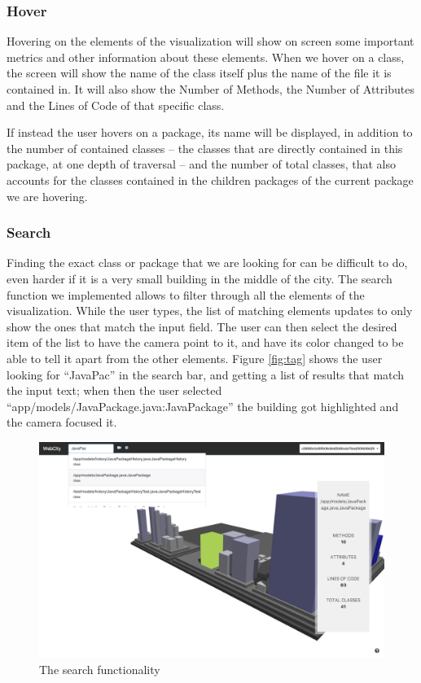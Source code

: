 \documentclass[]{usiinfbachelorproject}
\begin{document}
\subsubsection{Hover} \label{Hover}
Hovering on the elements of the visualization will show on screen some important metrics and other information about these elements.
When we hover on a class, the screen will show the name of the class itself plus the name of the file it is contained in. It will also show the Number of Methods,
 the Number of Attributes and the Lines of Code of that specific class.

 If instead the user hovers on a package, its name will be displayed, in addition to the number of contained classes -- the classes that are directly contained in this package, at one depth of traversal --
  and the number of total classes, that also accounts for the classes contained in the children packages of the current package we are hovering.

\subsubsection{Search} \label{Search}
Finding the exact class or package that we are looking for can be difficult to do, even harder if it is a very small building in the middle of the city.
The search function we implemented allows to filter through all the elements of the visualization. While the user types,
the list of matching elements updates to only show the ones that match the input field. The user can then select the desired item of the list to have the camera point to it,
and have its color changed to be able to tell it apart from the other elements.
Figure \ref{fig:tag} shows the user looking for ``JavaPac'' in the search bar, and getting a list of results that match the input text; when then the user selected ``app/models/JavaPackage.java:JavaPackage'' the building got highlighted and the camera focused it.

\begin{figure} [H]
\centering
\includegraphics[width=1\textwidth]{pictures/search.png}
\caption{The search functionality}
\label{fig:search}
\end{figure}
\end{document}
